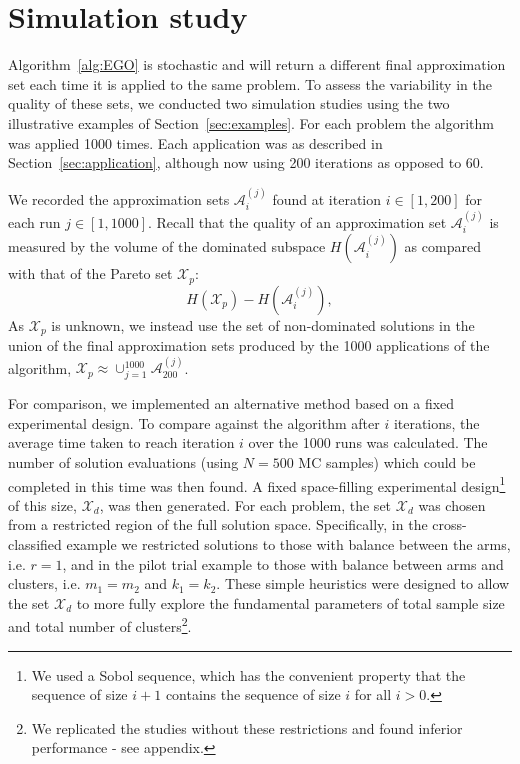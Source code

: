 \documentclass{article} %
\begin{document}
\section{Simulation study}\label{sec:simulation}

Algorithm~\ref{alg:EGO} is stochastic and will return a different final approximation set each time it is applied to the same problem. To assess the variability in the quality of these sets, we conducted two simulation studies using the two illustrative examples of Section~\ref{sec:examples}. For each problem the algorithm was applied 1000 times. Each application was as described in Section~\ref{sec:application}, although now using 200 iterations as opposed to 60. 

We recorded the approximation sets $\mathcal{A}_{i}^{(j)}$ found at iteration $i \in [1,200]$ for each run $j \in [1,1000]$. Recall that the quality of an approximation set $\mathcal{A}_{i}^{(j)}$ is measured by the volume of the dominated subspace $H(\mathcal{A}_{i}^{(j)})$ as compared with that of the Pareto set $\mathcal{X}_{p}$:
\begin{equation}
H(\mathcal{X}_{p}) - H(\mathcal{A}_{i}^{(j)}),
\end{equation}
As $\mathcal{X}_{p}$ is unknown, we instead use the set of non-dominated solutions in the union of the final approximation sets produced by the 1000 applications of the algorithm, $\mathcal{X}_{p} \approx \cup_{j=1}^{1000} \mathcal{A}_{200}^{(j)}$.

For comparison, we implemented an alternative method based on a fixed experimental design. To compare against the algorithm after $i$ iterations, the average time taken to reach iteration $i$ over the 1000 runs was calculated. The number of solution evaluations (using $N = 500$ MC samples) which could be completed in this time was then found. A fixed space-filling experimental design\footnote{We used a Sobol sequence, which has the convenient property that the sequence of size $i+1$ contains the sequence of size $i$ for all $i > 0$.}
of this size, $\mathcal{X}_{d}$, was then generated. For each problem, the set $\mathcal{X}_{d}$ was chosen from a restricted region of the full solution space. Specifically, in the cross-classified example we restricted solutions to those with balance between the arms, i.e. $r=1$, and in the pilot trial example to those with balance between arms and clusters, i.e. $m_{1} = m_{2}$ and $k_{1} = k_{2}$. These simple heuristics were designed to allow the set $\mathcal{X}_{d}$ to more fully explore the fundamental parameters of total sample size and total number of clusters\footnote{We replicated the studies without these restrictions and found inferior performance - see appendix.}.
\end{document}
